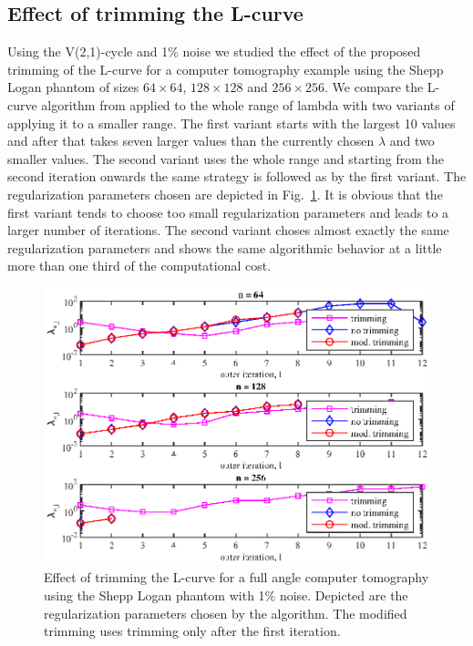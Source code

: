 \subsection{Effect of trimming the L-curve}
Using the V(2,1)-cycle and 1\% noise we studied the effect of the proposed trimming of the L-curve for a computer tomography example using the Shepp Logan phantom of sizes $64 \times 64$, $128 \times 128$ and $256 \times 256$. We compare the L-curve algorithm from \cite{OlearyHansen} applied to the whole range of lambda with two variants of applying it to a smaller range. The first variant starts with the largest 10 values and after that takes seven larger values than the currently chosen $\lambda$ and two smaller values. The second variant uses the whole range and starting from the second iteration onwards the same strategy is followed as by the first variant. The regularization parameters chosen are depicted in Fig.~\ref{fig:shepp_logan_reg_params_with_and_without_trimming}. It is obvious that the first variant tends to choose too small regularization parameters and leads to a larger number of iterations. The second variant choses almost exactly the same regularization parameters and shows the same algorithmic behavior at a little more than one third of the computational cost.
\begin{figure}[htbp]
\begin{center}
\includegraphics{figures/shepp_logan_reg_params_with_and_without_trimming}
\caption{Effect of trimming the L-curve for a full angle computer tomography using the Shepp Logan phantom with 1\% noise. Depicted are the regularization parameters chosen by the algorithm. The modified trimming uses trimming only after the first iteration.}
\label{fig:shepp_logan_reg_params_with_and_without_trimming}
\end{center}
\end{figure}

